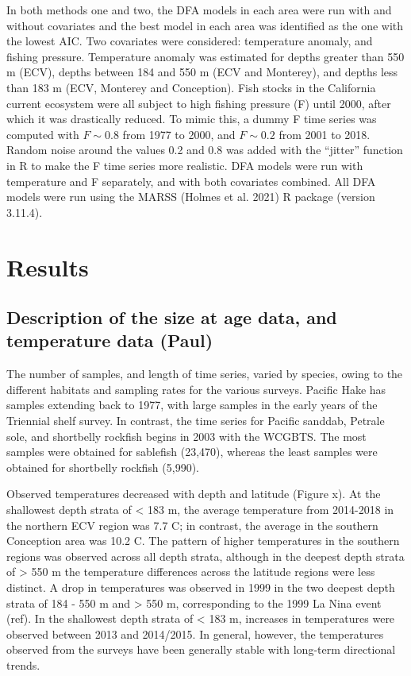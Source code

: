 \documentclass[
]{article}
\begin{document}
In both methods one and two, the DFA models in each area were run with
and without covariates and the best model in each area was identified as
the one with the lowest AIC. Two covariates were considered: temperature
anomaly, and fishing pressure. Temperature anomaly was estimated for
depths greater than 550 m (ECV), depths between 184 and 550 m (ECV and
Monterey), and depths less than 183 m (ECV, Monterey and Conception).
Fish stocks in the California current ecosystem were all subject to high
fishing pressure (F) until 2000, after which it was drastically reduced.
To mimic this, a dummy F time series was computed with \(F \sim 0.8\)
from 1977 to 2000, and \(F \sim 0.2\) from 2001 to 2018. Random noise
around the values 0.2 and 0.8 was added with the ``jitter'' function in
R to make the F time series more realistic. DFA models were run with
temperature and F separately, and with both covariates combined. All DFA
models were run using the MARSS (Holmes et al. 2021) R package (version
3.11.4).

\hypertarget{results}{%
\section{Results}\label{results}}

\hypertarget{description-of-the-size-at-age-data-and-temperature-data-paul}{%
\subsection{Description of the size at age data, and temperature data
(Paul)}\label{description-of-the-size-at-age-data-and-temperature-data-paul}}

The number of samples, and length of time series, varied by species,
owing to the different habitats and sampling rates for the various
surveys. Pacific Hake has samples extending back to 1977, with large
samples in the early years of the Triennial shelf survey. In contrast,
the time series for Pacific sanddab, Petrale sole, and shortbelly
rockfish begins in 2003 with the WCGBTS. The most samples were obtained
for sablefish (23,470), whereas the least samples were obtained for
shortbelly rockfish (5,990).

Observed temperatures decreased with depth and latitude (Figure x). At
the shallowest depth strata of \textless{} 183 m, the average
temperature from 2014-2018 in the northern ECV region was 7.7 C; in
contrast, the average in the southern Conception area was 10.2 C. The
pattern of higher temperatures in the southern regions was observed
across all depth strata, although in the deepest depth strata of
\textgreater{} 550 m the temperature differences across the latitude
regions were less distinct. A drop in temperatures was observed in 1999
in the two deepest depth strata of 184 - 550 m and \textgreater{} 550 m,
corresponding to the 1999 La Nina event (ref). In the shallowest depth
strata of \textless{} 183 m, increases in temperatures were observed
between 2013 and 2014/2015. In general, however, the temperatures
observed from the surveys have been generally stable with long-term
directional trends.
\end{document}
